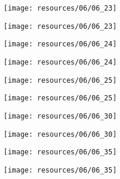 \begin{frame}{ }
    \centering
    \texttt{[image: resources/06/06\_23]}
\end{frame}
\begin{frame}{ }
    \centering
    \texttt{[image: resources/06/06\_23]}
\end{frame}
\begin{frame}{ }
    \centering
    \texttt{[image: resources/06/06\_24]}
\end{frame}
\begin{frame}{ }
    \centering
    \texttt{[image: resources/06/06\_24]}
\end{frame}
\begin{frame}{ }
    \centering
    \texttt{[image: resources/06/06\_25]}
\end{frame}
\begin{frame}{ }
    \centering
    \texttt{[image: resources/06/06\_25]}
\end{frame}
\begin{frame}{ }
    \centering
    \texttt{[image: resources/06/06\_30]}
\end{frame}
\begin{frame}{ }
    \centering
    \texttt{[image: resources/06/06\_30]}
\end{frame}
\begin{frame}{ }
    \centering
    \texttt{[image: resources/06/06\_35]}
\end{frame}
\begin{frame}{ }
    \centering
    \texttt{[image: resources/06/06\_35]}
\end{frame}
